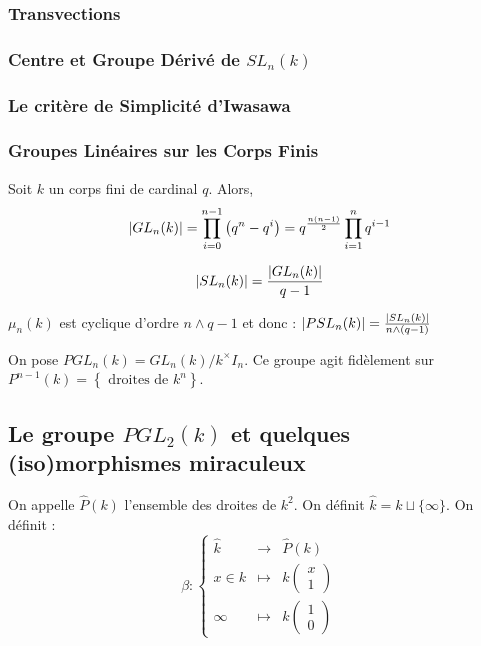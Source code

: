 \documentclass{cours}
\begin{document}
\subsubsection{Transvections}

\subsubsection{Centre et Groupe Dérivé de $SL_{n}(k)$}

\subsubsection{Le critère de Simplicité d'Iwasawa}

\subsubsection{Groupes Linéaires sur les Corps Finis}
\begin{lemma}
    Soit $k$ un corps fini de cardinal $q$. Alors, 
    \[
        \left|GL_{n}(k)\right| = \prod_{i = 0}^{n - 1} \left(q^{n} - q^{i}\right) = q^{\frac{n(n-1)}{2}}\prod_{i = 1}^{n}q^{i - 1}
    \]
\end{lemma}
\begin{corollary}
    \[\left|SL_{n}(k)\right| = \frac{\left|GL_{n}(k)\right|}{q - 1}\]
\end{corollary}
\begin{corollary}
    $\mu_{n}(k)$ est cyclique d'ordre $n \wedge q - 1$ et donc : $\left|PSL_{n}(k)\right| = \frac{\left|SL_{n}(k)\right|}{n \wedge (q - 1)}$
\end{corollary}

\begin{definition}
    On pose $PGL_{n}(k) = GL_{n}(k)/k^{\times}I_{n}$. Ce groupe agit fidèlement sur $P^{n - 1}(k) = \left\{\text{ droites de } k^{n}\right\}$.
\end{definition}

\subsection{Le groupe $PGL_{2}(k)$ et quelques (iso)morphismes miraculeux}
\begin{definition}
    On appelle $\hat{P}(k)$ l'ensemble des droites de $k^{2}$. On définit $\hat{k} = k \sqcup \{\infty\}$. On définit :
    \[
        \beta : \left\{\begin{array}{ccc}
            \hat{k} &\longrightarrow& \hat{P}(k)\\
            x \in k &\longmapsto & k\left(\begin{array}{c} x \\ 1               
            \end{array}\right)\\
            \infty & \longmapsto &k\left(\begin{array}{c} 1 \\ 0
            \end{array}\right)
        \end{array}\right.    
    \]
\end{definition}
\end{document}

